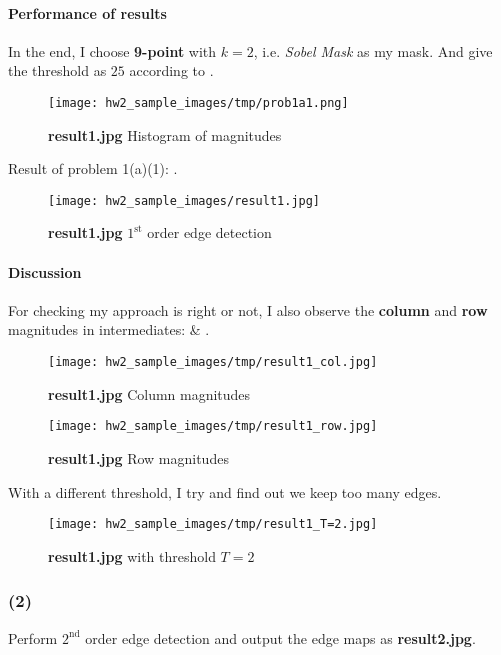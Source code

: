 \paragraph{Performance of results}
In the end, I choose \textbf{9-point} with \textbf{\(k=2\)}, i.e. \textit{Sobel Mask} as my mask. And give the threshold as \textbf{\(25\)} according to  .
\begin{figure}
    \centering
    \texttt{[image: hw2\_sample\_images/tmp/prob1a1.png]}
    \caption{\textbf{result1.jpg} Histogram of magnitudes}
    \label{prob1a1}
\end{figure}

Result of problem 1(a)(1): .
\begin{figure}
    \centering
    \texttt{[image: hw2\_sample\_images/result1.jpg]}
    \caption{\textbf{result1.jpg} $1^{\mbox{st}}$ order edge detection}
    \label{result1}
\end{figure}

\paragraph{Discussion}
For checking my approach is right or not, I also observe the \textbf{column} and \textbf{row} magnitudes in intermediates:  \& .
\begin{figure}
    \centering
    \texttt{[image: hw2\_sample\_images/tmp/result1\_col.jpg]}
    \caption{\textbf{result1.jpg} Column magnitudes}
    \label{result1_col}
\end{figure}

\begin{figure}
    \centering
    \texttt{[image: hw2\_sample\_images/tmp/result1\_row.jpg]}
    \caption{\textbf{result1.jpg} Row magnitudes}
    \label{result1_row}
\end{figure}

With a different threshold, I try  and find out we keep too many edges.
\begin{figure}
    \centering
    \texttt{[image: hw2\_sample\_images/tmp/result1\_T=2.jpg]}
    \caption{\textbf{result1.jpg} with threshold $T=2$}
    \label{result1_T2}
\end{figure}

\subsubsection{(2)}
Perform $2^{\mbox{nd}}$ order edge detection and output the edge maps as \textbf{result2.jpg}.

